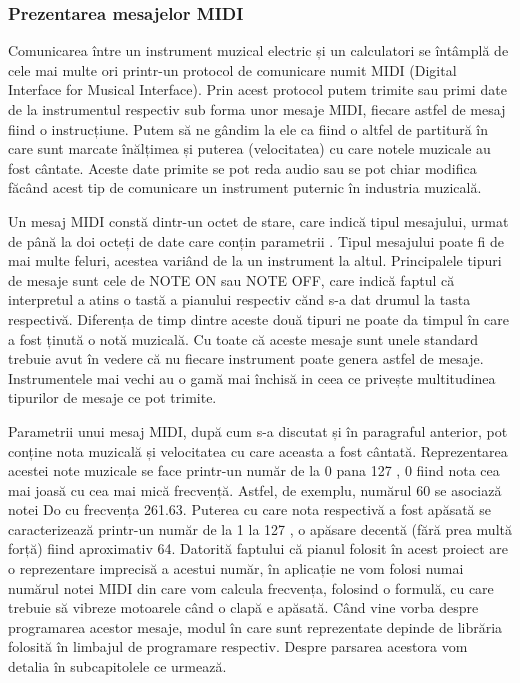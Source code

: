 \documentclass[../IoMusT.tex]{subfiles}
\begin{document}
\subsubsection{Prezentarea mesajelor MIDI}
Comunicarea între un instrument muzical electric și un calculatori se întâmplă de cele mai multe ori printr-un protocol de comunicare numit MIDI (Digital Interface for Musical Interface). Prin acest protocol putem trimite sau primi date de la instrumentul respectiv sub forma unor mesaje MIDI, fiecare astfel de mesaj fiind o instrucțiune. Putem să ne gândim la ele ca fiind o altfel de partitură în care sunt marcate înălțimea și puterea (velocitatea) cu care notele muzicale au fost cântate. Aceste date primite se pot reda audio sau se pot chiar modifica făcând acest tip de comunicare un instrument puternic în industria muzicală. 
\\
\par Un mesaj MIDI constă dintr-un octet de stare, care indică tipul mesajului, urmat de până la doi octeți de date care conțin parametrii \cite{MIDIBytes}. Tipul mesajului poate fi de mai multe feluri, acestea variând de la un instrument la altul. Principalele tipuri de mesaje sunt cele de NOTE ON sau NOTE OFF, care indică faptul că interpretul a atins o tastă a pianului respectiv cănd s-a dat drumul la tasta respectivă. Diferența de timp dintre aceste două tipuri ne poate da timpul în care a fost ținută o notă muzicală. Cu toate că aceste mesaje sunt unele standard trebuie avut în vedere că nu fiecare instrument poate genera astfel de mesaje. Instrumentele mai vechi au o gamă mai închisă in ceea ce privește multitudinea tipurilor de mesaje ce pot trimite.
\\ 
\par Parametrii unui mesaj MIDI, după cum s-a discutat și în paragraful anterior, pot conține nota muzicală și velocitatea cu care aceasta a fost cântată. Reprezentarea acestei note muzicale se face printr-un număr de la 0 pana 127 \cite{MidiSoftware}, 0 fiind nota cea mai joasă cu cea mai mică frecvență. Astfel, de exemplu, numărul 60 se asociază notei Do cu frecvența 261.63. Puterea cu care nota respectivă a fost apăsată se caracterizează printr-un număr de la 1 la 127 \cite{MidiSoftware}, o apăsare decentă (fără prea multă forță) fiind aproximativ 64. Datorită faptului că pianul folosit în acest proiect are o reprezentare imprecisă a acestui număr, în aplicație ne vom folosi numai numărul notei MIDI din care vom calcula frecvența, folosind o formulă, cu care trebuie să vibreze motoarele când o clapă e apăsată. Când vine vorba despre programarea acestor mesaje, modul în care sunt reprezentate depinde de librăria folosită în limbajul de programare respectiv. Despre parsarea acestora vom detalia în subcapitolele ce urmează.
\end{document}
